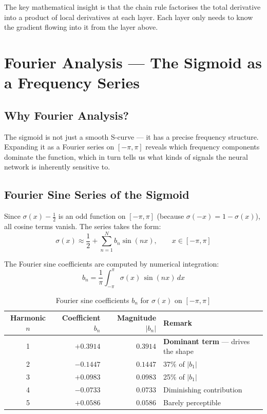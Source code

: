\documentclass[12pt,a4paper]{article}
\begin{document}
The key mathematical insight is that the chain rule factorises the total derivative into a product of local derivatives at each layer. Each layer only needs to know the gradient flowing into it from the layer above.

\newpage

\section{Fourier Analysis --- The Sigmoid as a Frequency Series}

\subsection{Why Fourier Analysis?}

The sigmoid is not just a smooth S-curve --- it has a precise frequency structure. Expanding it as a Fourier series on $[-\pi, \pi]$ reveals which frequency components dominate the function, which in turn tells us what kinds of signals the neural network is inherently sensitive to.

\subsection{Fourier Sine Series of the Sigmoid}

Since $\sigma(x) - \tfrac{1}{2}$ is an odd function on $[-\pi, \pi]$ (because $\sigma(-x) = 1 - \sigma(x)$), all cosine terms vanish. The series takes the form:
\begin{equation}
  \sigma(x) \approx \frac{1}{2} + \sum_{n=1}^{N} b_n \sin(nx), \qquad x \in [-\pi, \pi]
  \label{eq:fourier}
\end{equation}

The Fourier sine coefficients are computed by numerical integration:
\begin{equation}
  b_n = \frac{1}{\pi}\int_{-\pi}^{\pi} \sigma(x)\,\sin(nx)\,dx
  \label{eq:bn}
\end{equation}

\begin{table}[H]
  \centering
  \caption{Fourier sine coefficients $b_n$ for $\sigma(x)$ on $[-\pi, \pi]$}
  \renewcommand{\arraystretch}{1.25}
  \begin{tabular}{c r r l}
    \toprule
    \textbf{Harmonic} $n$ & \textbf{Coefficient} $b_n$ & \textbf{Magnitude} $|b_n|$ & \textbf{Remark} \\
    \midrule
    1 & $+0.3914$ & $0.3914$ & \textbf{Dominant term} --- drives the shape \\
    2 & $-0.1447$ & $0.1447$ & 37\% of $|b_1|$ \\
    3 & $+0.0983$ & $0.0983$ & 25\% of $|b_1|$ \\
    4 & $-0.0733$ & $0.0733$ & Diminishing contribution \\
    5 & $+0.0586$ & $0.0586$ & Barely perceptible \\
    \bottomrule
  \end{tabular}
  \label{tab:fourier}
\end{table}
\end{document}
